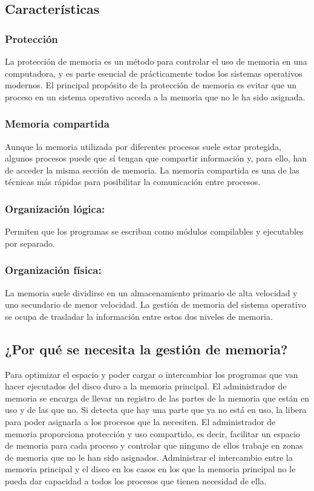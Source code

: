 \documentclass{article}
\begin{document}
\subsection{Características}

\subsubsection{Protección} 
La protección de memoria es un método para controlar el uso de memoria en una computadora, y es parte esencial de prácticamente todos los sistemas operativos modernos. El principal propósito de la protección de memoria es evitar que un proceso en un sistema operativo acceda a la memoria que no le ha sido asignada.

\subsubsection{Memoria compartida}
Aunque la memoria utilizada por diferentes procesos suele estar protegida, algunos procesos puede que sí tengan que compartir información y, para ello, han de acceder la misma sección de memoria. La memoria compartida es una de las técnicas más rápidas para posibilitar la comunicación entre procesos.

\subsubsection{Organización lógica:}
Permiten que los programas se escriban como módulos compilables y ejecutables por separado.

\subsubsection{Organización física:}
La memoria suele dividirse en un almacenamiento primario de alta velocidad y uno secundario de menor velocidad.  La gestión de memoria del sistema operativo se ocupa de trasladar la información entre estos dos niveles de memoria.

\subsection{¿Por qué se necesita la gestión de memoria?}
Para optimizar el espacio y poder cargar o intercambiar los programas que van hacer ejecutados del disco duro a la memoria principal.\newline
El administrador de memoria se encarga de llevar un registro de las partes de la memoria que están en uso y de las que no. Si detecta que hay una parte que ya no está en uso, la libera para poder asignarla a los procesos que la necesiten.
El administrador de memoria proporciona protección y uso compartido, es decir, facilitar un espacio de memoria para cada proceso y controlar que ninguno de ellos trabaje en zonas de memoria que no le han sido asignados.\newline
Administrar el intercambio entre la memoria principal y el disco en los casos en los que la memoria principal no le pueda dar capacidad a todos los procesos que tienen necesidad de ella.\cite{Sistemas}
\end{document}
